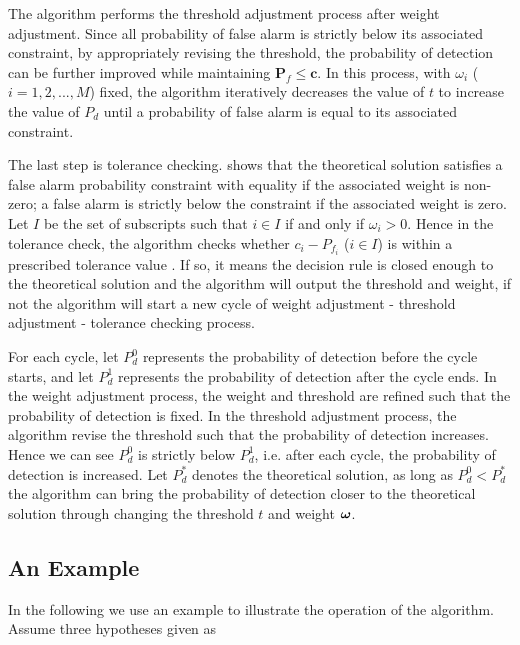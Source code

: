  The algorithm performs the threshold adjustment process after weight adjustment. Since all probability of false alarm is strictly below its associated constraint, by appropriately revising the threshold, the probability of detection can be further improved while maintaining $\mathbf{P}_f \leq \mathbf{c}$. In this process, with $\omega_i$ ($i=1, 2, ..., M$) fixed, the algorithm iteratively decreases the value of $t$ to increase the value of $P_d$ until a probability of false alarm is equal to its associated constraint.  

The last step is tolerance checking. \cite{zhang2000efficient} shows that the theoretical solution satisfies a false alarm probability constraint with equality if the associated weight is non-zero; a false alarm is strictly below the constraint if the associated weight is zero. 
Let $I$ be the set of subscripts such that $i \in I$ if and only if $\omega_i > 0$. 
Hence in the tolerance check, the algorithm checks whether $c_i - P_{f_i}$ ($i \in I$) is within a prescribed tolerance value . If so, it means the decision rule is closed enough to the theoretical solution and the algorithm will output the threshold and weight, if not the algorithm will start a new cycle of weight adjustment - threshold adjustment - tolerance checking process. 

For each cycle, let $P_d^0$ represents the probability of detection before the cycle starts, and let $P_d^1$ represents the probability of detection after the cycle ends. In the weight adjustment process, the weight and threshold are refined such that the probability of detection is fixed. In the threshold adjustment process, the algorithm revise the threshold such that the probability of detection increases. Hence we can see $P_d^0$ is strictly below $P_d^1$, i.e. after each cycle, the probability of detection is increased. Let $P_d^\ast$ denotes the theoretical solution, as long as $P_d^0 < P_d^\ast$  the algorithm can bring the probability of detection closer to the theoretical solution  through changing the threshold $t$ and weight $\boldsymbol{\omega}$.

\subsection{An Example}
In the following we use an example to illustrate the operation of the algorithm. Assume three hypotheses given as

